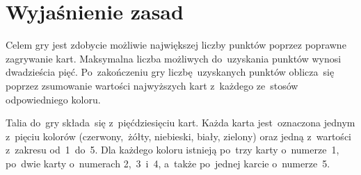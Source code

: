 \documentclass[declaration,shortabstract,inz]{iithesis}
\begin{document}
\section{Wyjaśnienie zasad}

Celem gry jest zdobycie możliwie największej liczby punktów poprzez poprawne zagrywanie kart. Maksymalna liczba możliwych do~uzyskania punktów wynosi dwadzieścia pięć. Po~zakończeniu gry liczbę uzyskanych punktów oblicza~się poprzez zsumowanie wartości najwyższych kart z~każdego ze~stosów odpowiedniego koloru.

Talia do~gry składa~się z~pięćdziesięciu kart. Każda karta jest~oznaczona jednym z~pięciu kolorów (czerwony, żółty, niebieski, biały, zielony) oraz jedną z~wartości z~zakresu od~1~do~5. Dla każdego koloru istnieją po~trzy karty o~numerze~1, po~dwie karty o~numerach 2,~3~i~4, a~także po~jednej karcie o~numerze~5.
\end{document}
